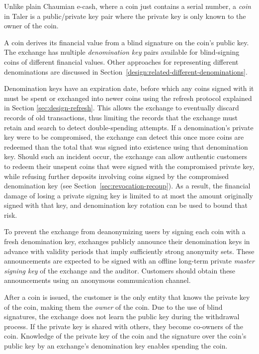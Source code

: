 Unlike plain Chaumian e-cash, where a coin just contains a serial number, a
\emph{coin} in Taler is a public/private key pair where the private key is only
known to the owner of the coin.

A coin derives its financial value from a blind signature on the coin's
public key. The exchange has multiple \emph{denomination key} pairs available
for blind-signing coins of different financial values.  Other approaches for representing
different denominations are discussed in Section~\ref{design:related-different-denominations}.

Denomination keys have an expiration date, before which any coins signed with
it must be spent or exchanged into newer coins using the refresh protocol
explained in Section \ref{sec:design-refresh}.  This allows the exchange to
eventually discard records of old transactions, thus limiting the records that
the exchange must retain and search to detect double-spending attempts.  If a
denomination's private key were to be compromised, the exchange can detect this
once more coins are redeemed than the total that was signed into existence
using that denomination key.  Should such an incident occur, the exchange can allow authentic
customers to redeem their unspent coins that were signed with the compromised
private key, while refusing further deposits involving coins signed by the
compromised denomination key (see Section~\ref{sec:revocation-recoup}).  As a result, the
financial damage of losing a private signing key is limited to at most the
amount originally signed with that key, and denomination key rotation can be
used to bound that risk.

To prevent the exchange from deanonymizing users by signing each coin with a
fresh denomination key, exchanges publicly announce their denomination keys
in advance with validity periods that imply sufficiently strong anonymity sets.
These announcements are expected to be signed with an offline long-term
private \emph{master signing key} of the exchange and the auditor.
Customers should obtain these announcements using an anonymous
communication channel.

After a coin is issued, the customer is the only entity that knows the
private key of the coin, making them the \emph{owner} of the coin.  Due
to the use of blind signatures, the exchange does not learn the
public key during the withdrawal process.  If the private key is
shared with others, they become co-owners of the coin.  Knowledge of
the private key of the coin and the signature over the coin's public
key by an exchange's denomination key enables spending the
coin.

